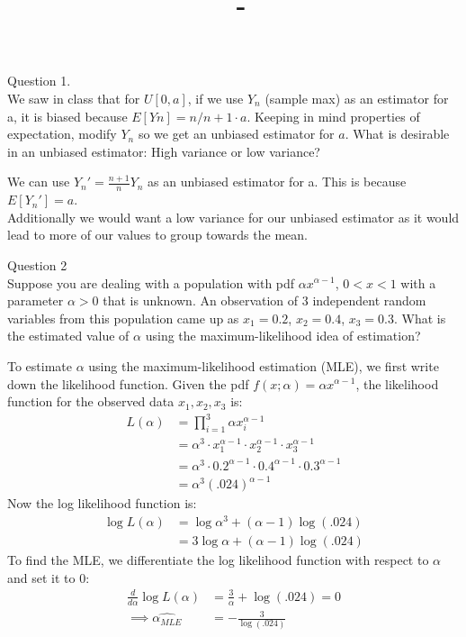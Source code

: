 \documentclass[answers,12pt,addpoints]{exam}
\author{\name}
\title{\course \ - \assignment}
\begin{document}
\maketitle

\begin{questions}
    \question Question 1. \\
    We saw in class that for $U [0, a]$, if we use $Y_n$ (sample max) as an estimator for a, it is biased because $E[Yn] = n/n+1 \cdot a $. Keeping in
mind properties of expectation, modify $Y_n$ so we get an unbiased estimator for $a$.
What is desirable in an unbiased estimator: High variance or low variance?
\begin{solution}
    We can use $Y_n' = \frac{n+1}{n}Y_n$ as an unbiased estimator for a. This is because $E[Y_n'] = a$.\\
Additionally we would want a low variance for our unbiased estimator as it would lead to more of our values to group towards the mean.
\end{solution}
    \question Question 2 \\
    Suppose you are dealing with a population with pdf $\alpha x^{\alpha-1}$, $0 < x < 1$ with a parameter $\alpha > 0$ that is unknown.
    An observation of 3 independent random variables from this population came up as $x_1 = 0.2$, $x_2 = 0.4$, $x_3 = 0.3$. What is the
    estimated value of $\alpha$ using the maximum-likelihood idea of estimation?
    \begin{solution}
        To estimate $\alpha$ using the maximum-likelihood estimation (MLE), we first write down the likelihood function. Given the pdf $f(x; \alpha) = \alpha x^{\alpha-1}$, the likelihood function for the observed data $x_1, x_2, x_3$ is:
        \begin{align*}
        L(\alpha) &= \prod_{i=1}^{3} \alpha x_i^{\alpha-1} \\
        &= \alpha^3 \cdot x_1^{\alpha-1} \cdot x_2^{\alpha-1} \cdot x_3^{\alpha-1}\\ 
        &=\alpha^3 \cdot 0.2^{\alpha-1} \cdot 0.4^{\alpha-1} \cdot 0.3^{\alpha-1}\\
        &= \alpha^3 (.024)^{\alpha-1}
        \end{align*}
        Now the log likelihood function is:
        \begin{align*}
            \log L(\alpha) &= \log \alpha^3 + (\alpha-1) \log(.024)\\
            &= 3 \log \alpha + (\alpha-1) \log(.024)
        \end{align*}
        To find the MLE, we differentiate the log likelihood function with respect to $\alpha$ and set it to 0:
        \begin{align*}
            \frac{d}{d\alpha} \log L(\alpha) &= \frac{3}{\alpha} + \log(.024) = 0\\
            \implies \hat{\alpha_{MLE}} &= -\frac{3}{\log(.024)} 
        \end{align*}
        

        
    \end{solution}


\end{questions}
\end{document}
